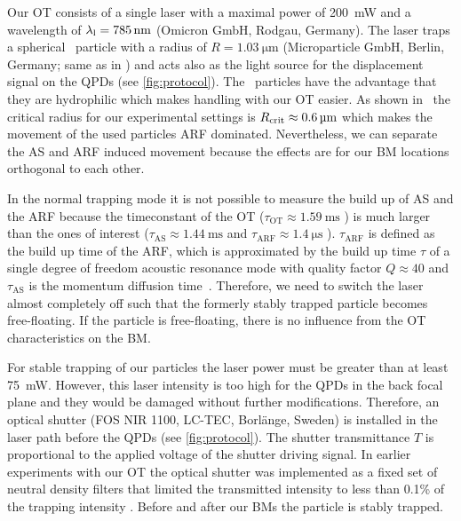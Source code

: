 Our OT consists of a single laser with a maximal power of \SI{200}{\milli\watt} 
and a wavelength of $\llaser = \SI{785}{\nm}$ (Omicron GmbH, Rodgau, Germany). 
The laser traps a spherical \SiO~particle with a radius of $R=\SI{1.03}{\um}$ 
(Microparticle GmbH, Berlin, Germany; same as in \cite{Goering2021}) and acts 
also as the light source for the displacement signal on the QPDs (see 
\cref{fig:protocol}). The \SiO~particles have the advantage that they are 
hydrophilic which makes handling with our OT easier. As shown 
in~\cite{Goering2021} the critical radius for our experimental settings is 
$R_{\mathrm{crit}}\approx\SI{0.6}{\si{\micro\meter}}$ which makes the movement of the used particles ARF 
dominated. Nevertheless, we can separate the AS and ARF induced movement 
because the effects are for our BM locations orthogonal to each other.

In the normal trapping mode it is not possible to measure the build up of AS 
and the ARF because the timeconstant of the OT ($\tau_{\mathrm{OT}}\approx 
\SI{1.59}{\ms}$ \cite{Goering2021}) is much larger than the ones of interest 
($\tau_{\mathrm{AS}}\approx \SI{1.44}{\ms}$ and $\tau_{\mathrm{ARF}}\approx 
\SI{1.4}{\us}$ \cite{Goering2021}). $\tau_{\mathrm{ARF}}$ is defined as the 
build up time of the ARF, which is approximated by the build up time $\tau$ of 
a single degree of freedom acoustic resonance mode with quality factor 
$Q\approx 40$ and $\tau_{\mathrm{AS}}$ is the momentum diffusion 
time~\cite{Muller2015}. Therefore, we need to switch the laser almost 
completely off such that the formerly stably trapped particle becomes 
free-floating. If the particle is free-floating, there is no influence from the 
OT characteristics on the BM.

For stable trapping of our particles the laser power must be greater than at 
least \SI{75}{\milli\watt}. However, this laser intensity is too high for the 
QPDs in the back focal plane and they would be damaged without further 
modifications. Therefore, an optical shutter (FOS NIR 1100, LC-TEC, Borlänge, 
Sweden) is installed in the laser path before the QPDs (see 
\cref{fig:protocol}). The shutter transmittance $T$ is proportional to the 
applied voltage of the shutter driving signal. In earlier experiments with our 
OT the optical shutter was implemented as a fixed set of neutral density 
filters that limited the transmitted intensity to less than 0.1\% of the 
trapping intensity \cite{Lakaemper2015,Lamprecht2016,Lamprecht2021}. Before and 
after our BMs the particle is stably trapped.

